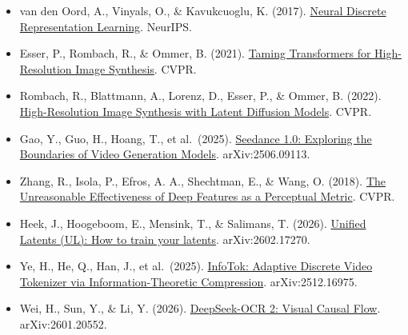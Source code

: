 \vspace{0.25em}
\begin{itemize}
\tightlist
\item
  van den Oord, A., Vinyals, O., \& Kavukcuoglu, K. (2017). \href{https://arxiv.org/abs/1711.00937}{Neural Discrete Representation Learning}. NeurIPS.
\item
  Esser, P., Rombach, R., \& Ommer, B. (2021). \href{https://arxiv.org/abs/2012.09841}{Taming Transformers for High-Resolution Image Synthesis}. CVPR.
\item
  Rombach, R., Blattmann, A., Lorenz, D., Esser, P., \& Ommer, B. (2022). \href{https://arxiv.org/abs/2112.10752}{High-Resolution Image Synthesis with Latent Diffusion Models}. CVPR.
\item
  Gao, Y., Guo, H., Hoang, T., et al.~(2025). \href{https://arxiv.org/abs/2506.09113}{Seedance 1.0: Exploring the Boundaries of Video Generation Models}. arXiv:2506.09113.
\item
  Zhang, R., Isola, P., Efros, A. A., Shechtman, E., \& Wang, O. (2018). \href{https://arxiv.org/abs/1801.03924}{The Unreasonable Effectiveness of Deep Features as a Perceptual Metric}. CVPR.
\item
  Heek, J., Hoogeboom, E., Mensink, T., \& Salimans, T. (2026). \href{https://arxiv.org/abs/2602.17270}{Unified Latents (UL): How to train your latents}. arXiv:2602.17270.
\item
  Ye, H., He, Q., Han, J., et al.~(2025). \href{https://arxiv.org/abs/2512.16975}{InfoTok: Adaptive Discrete Video Tokenizer via Information-Theoretic Compression}. arXiv:2512.16975.
\item
  Wei, H., Sun, Y., \& Li, Y. (2026). \href{https://arxiv.org/abs/2601.20552}{DeepSeek-OCR 2: Visual Causal Flow}. arXiv:2601.20552.
\end{itemize}

\clearpage
